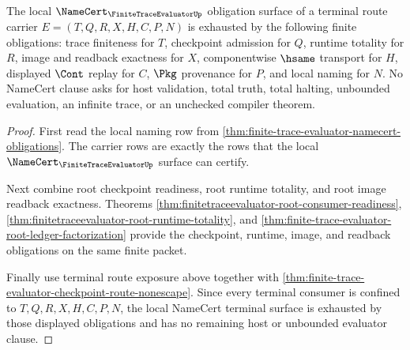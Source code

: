 \begin{theorem}
\label{thm:finite-trace-evaluator-namecert-terminal-obligation-surface}
The local $\NameCert_{\FiniteTraceEvaluatorUp}$ obligation surface of a
terminal route carrier $E=(T,Q,R,X,H,C,P,N)$ is exhausted by the following
finite obligations: trace finiteness for $T$, checkpoint admission for $Q$,
runtime totality for $R$, image and readback exactness for $X$, componentwise
$\hsame$ transport for $H$, displayed $\Cont$ replay for $C$, $\Pkg$
provenance for $P$, and local naming for $N$. No NameCert clause asks for host
validation, total truth, total halting, unbounded evaluation, an infinite
trace, or an unchecked compiler theorem.
\end{theorem}
\begin{proof}
First read the local naming row from
\autoref{thm:finite-trace-evaluator-namecert-obligations}. The carrier rows
are exactly the rows that the local $\NameCert_{\FiniteTraceEvaluatorUp}$
surface can certify.

Next combine root checkpoint readiness, root runtime totality, and root image
readback exactness. Theorems
\autoref{thm:finitetraceevaluator-root-consumer-readiness},
\autoref{thm:finitetraceevaluator-root-runtime-totality}, and
\autoref{thm:finite-trace-evaluator-root-ledger-factorization} provide the
checkpoint, runtime, image, and readback obligations on the same finite
packet.

Finally use terminal route exposure above together with
\autoref{thm:finite-trace-evaluator-checkpoint-route-nonescape}. Since every
terminal consumer is confined to $T,Q,R,X,H,C,P,N$, the local NameCert terminal
surface is exhausted by those displayed obligations and has no remaining host
or unbounded evaluator clause.
\end{proof}
